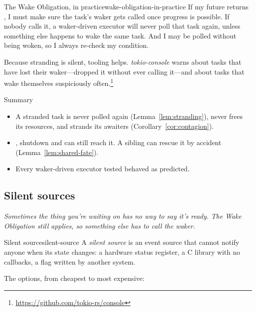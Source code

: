 \begin{proposition}{The Wake Obligation, in practice}{wake-obligation-in-practice}
    If my future returns , I must make sure the task's waker gets called once progress is possible. If nobody calls it, a waker-driven executor will never poll that task again, unless something else happens to wake the same task. And I may be polled without being woken, so I always re-check my condition.
\end{proposition}

Because stranding is silent, tooling helps. \emph{tokio-console} warns about tasks that have lost their waker---dropped it without ever calling it---and about tasks that wake themselves suspiciously often.\footnote{\url{https://github.com/tokio-rs/console}}

\begin{quotebox}{Summary}
    \begin{itemize}
        \item A stranded task is never polled again (Lemma~\ref{lem:stranding}), never frees its resources, and strands its awaiters (Corollary~\ref{cor:contagion}).
        \item {}, shutdown and  can still reach it. A sibling can rescue it by accident (Lemma~\ref{lem:shared-fate}).
        \item Every waker-driven executor tested behaved as predicted.
    \end{itemize}
\end{quotebox}

\subsection{Silent sources}
\label{sec:wakers-ch9}

\textit{Sometimes the thing you're waiting on has no way to say it's ready. The Wake Obligation still applies, so something else has to call the waker.}

\begin{definition}{Silent source}{silent-source}
    A \emph{silent source} is an event source that cannot notify anyone when its state changes: a hardware status register, a C library with no callbacks, a flag written by another system.
\end{definition}

The options, from cheapest to most expensive:

